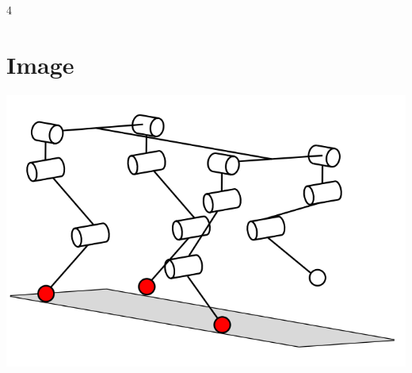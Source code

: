 \documentclass[landscape, letterpaper]{article}
\def\cols{4}
\begin{document}
\begin{multicols*}{\cols}
    \section{Image}
    \includegraphics[width=\linewidth]{img/example.png} 

   


\end{multicols*}
\end{document}
